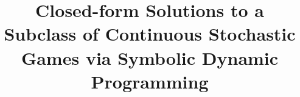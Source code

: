 \title{Closed-form Solutions to a Subclass of Continuous Stochastic Games via Symbolic Dynamic Programming}



\maketitle